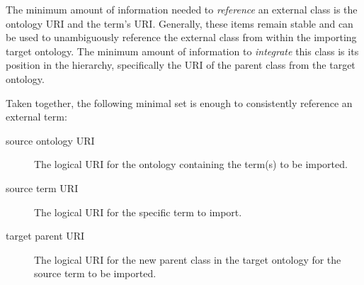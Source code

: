 \documentclass[a4paper,10pt,twocolumn]{article}
\begin{document}


The minimum amount of information needed to \textit{reference} an external class is the ontology URI and the term's URI.
Generally, these items remain stable and can be used to unambiguously reference the external class from within the importing target ontology.
The minimum amount of information to \textit{integrate} this class is its position in the hierarchy, specifically the URI of the parent class from the target ontology.


Taken together, the following minimal set is enough to consistently reference an external term:
\begin{description}
 \item[source ontology URI] The logical URI for the ontology containing the term(s) to be imported. %
 \item[source term URI] The logical URI for the specific term to import. %
 \item[target parent URI] The logical URI for the new parent class in the target ontology for the source term to be imported. %
 \end{description} 
 
\end{document}
